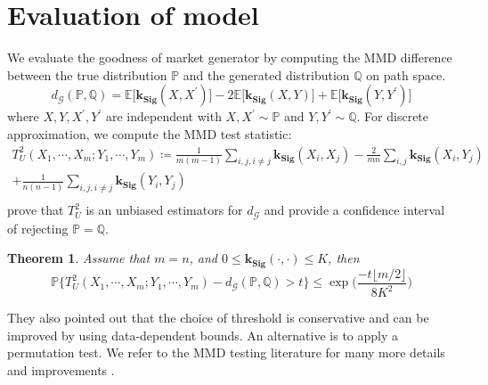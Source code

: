 \documentclass[12pt]{report}
\newtheorem{theorem}{Theorem}[chapter]
\theoremstyle{definition}
\theoremstyle{remark}
\newcommand{\E}{\mathbb{E}}
\renewcommand{\P}{\mathbb{P}}
\begin{document}
\section{Evaluation of model}
We evaluate the goodness of market generator by computing the MMD difference between the true distribution $\P$ and the generated distribution $\mathbb{Q}$ on path space. 
\begin{equation}
   d_{\mathcal{G}}(\P,\mathbb{Q}) = \E\big[\mathbf{k_{Sig}}(X,X^{\prime})\big] - 2\E\big[\mathbf{k_{Sig}}(X,Y)\big] + \E\big[\mathbf{k_{Sig}}(Y,Y^{\prime})\big]
\end{equation}
where $X,Y,X^{\prime},Y^{\prime}$ are independent with $X,X^{\prime}\sim\P$ and $Y,Y^{\prime}\sim\mathbb{Q}$. For discrete approximation, we compute the MMD
test statistic:
\begin{equation*}
  \begin{split}
    T^2_U(X_1, \cdots, X_m; Y_1,\cdots,Y_m) \coloneq \frac{1}{m(m-1)}\sum_{i,j,i\neq j} \mathbf{k_{Sig}}(X_{i},X_{j}) - \frac{2}{mn}\sum_{i,j} \mathbf{k_{Sig}}(X_{i},Y_{j})\\
    + \frac{1}{n(n-1)}\sum_{i,j,i\neq j} \mathbf{k_{Sig}}(Y_{i},Y_{j})\\
  \end{split}
\end{equation*}
\cite{gretton2012kernel, gretton2009fast} prove that $T^2_U$ is an unbiased estimators for $d_{\mathcal{G}}$ and provide a confidence interval of rejecting $\P = \mathbb{Q}$. 
\begin{theorem}
  Assume that $m = n$, and $0 \leq \mathbf{k_{Sig}}(\cdot,\cdot) \leq K$, then 
  \begin{equation*}
    \P\bigg\{T^2_U(X_1, \cdots, X_m; Y_1,\cdots,Y_m) - d_{\mathcal{G}}(\P,\mathbb{Q}) > t \bigg\} \leq \exp\Big(\frac{-t\lfloor m/2 \rfloor}{8K^{2}}\Big)
  \end{equation*}
\end{theorem}



They also pointed out that the choice of threshold is conservative and can be improved by using data-dependent bounds. An alternative is to apply a permutation test. We refer to the MMD testing literature for many more details and improvements \cite{gretton2012kernel, gretton2009fast, chwialkowski2016kernel, sejdinovic2013equivalence, jitkrittum2016interpretable, sriperumbudur2010hilbert}.




\end{document}
